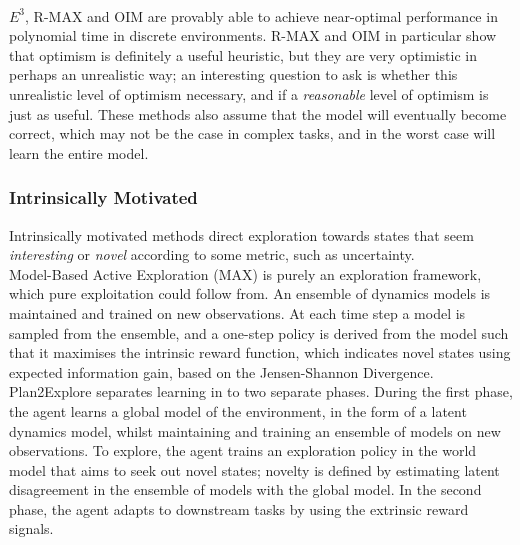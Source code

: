 \\ $E^3$, R-MAX and OIM are provably able to achieve near-optimal performance in polynomial time in discrete environments. R-MAX and OIM in particular show that optimism is definitely a useful heuristic, but they are very optimistic in perhaps an unrealistic way; an interesting question to ask is whether this unrealistic level of optimism necessary, and if a \textit{reasonable} level of optimism is just as useful. These methods also assume that the model will eventually become correct, which may not be the case in complex tasks, and in the worst case will learn the entire model.
\subsubsection{Intrinsically Motivated}
Intrinsically motivated methods direct exploration towards states that seem \textit{interesting} or \textit{novel} according to some metric, such as uncertainty.
\\ Model-Based Active Exploration (MAX) \cite{DBLP:journals/corr/abs-1810-12162} is purely an exploration framework, which pure exploitation could follow from. An ensemble of dynamics models is maintained and trained on new observations. At each time step a model is sampled from the ensemble, and a one-step policy is derived from the model such that it maximises the intrinsic reward function, which indicates novel states using expected information gain, based on the Jensen-Shannon Divergence.
\\Plan2Explore \cite{plan2explore} separates learning in to two separate phases. During the first phase, the agent learns a global model of the environment, in the form of a latent dynamics model, whilst maintaining and training an ensemble of models on new observations. To explore, the agent trains an exploration policy in the world model that aims to seek out novel states; novelty is defined by estimating latent disagreement in the ensemble of models with the global model. In the second phase, the agent adapts to downstream tasks by using the extrinsic reward signals.
